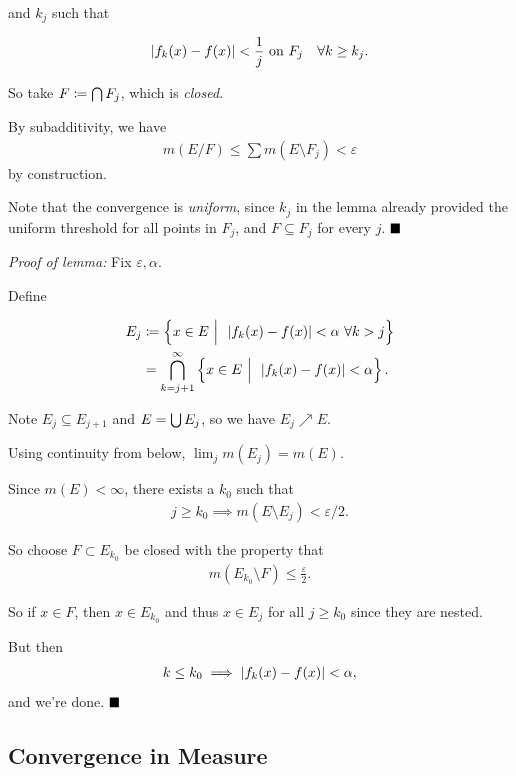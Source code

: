 and \(k_j\) such that

\begin{align*}
{\left\lvert {f_k(x) - f(x)} \right\rvert} < \frac 1 j \text{ on } F_j \quad \forall k \geq k_j
.\end{align*}

So take \(F \coloneqq \bigcap F_j\), which is \emph{closed}.

By subadditivity, we have
\begin{align*}
m(E/F) \leq \sum m(E\setminus F_j) < \varepsilon
\end{align*} by construction.

Note that the convergence is \emph{uniform}, since \(k_j\) in the lemma
already provided the uniform threshold for all points in \(F_j\), and
\(F \subseteq F_j\) for every \(j\). \(\qed\)

\emph{Proof of lemma:} Fix \(\varepsilon, \alpha\).

Define

\begin{align*}
E_j &\coloneqq \left\{{x\in E {~\mathrel{\Big|}~}~ {\left\lvert {f_k(x) - f(x)} \right\rvert} < \alpha~~\forall k > j}\right\} \\
&= \bigcap_{k=j+1}^\infty \left\{{x\in E {~\mathrel{\Big|}~}~ {\left\lvert {f_k(x) - f(x)} \right\rvert} < \alpha}\right\}
.\end{align*}

Note \(E_j \subseteq E_{j+1}\) and \(E = \bigcup E_j\), so we have
\(E_j \nearrow E\).

Using continuity from below, \(\lim_j m(E_j) = m(E)\).

Since \(m(E) < \infty\), there exists a \(k_0\) such that
\begin{align*}
j \geq k_0 \implies m(E\setminus E_j) < \varepsilon / 2
.\end{align*}

So choose \(F \subset E_{k_0}\) be closed with the property that
\begin{align*}
m(E_{k_0} \setminus F) \leq \frac \varepsilon  2
.\end{align*}

So if \(x\in F\), then \(x\in E_{k_0}\) and thus \(x\in E_j\) for all
\(j\geq k_0\) since they are nested.

But then
\begin{align*}
k \leq k_0 \implies {\left\lvert {f_k(x) - f(x)} \right\rvert} < \alpha
,\end{align*} and we're done. \(\qed\)

\hypertarget{convergence-in-measure}{%
\subsection{Convergence in Measure}\label{convergence-in-measure}}

